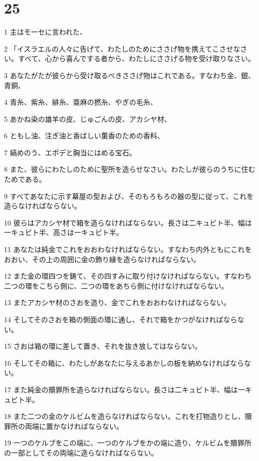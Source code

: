 \chapter{25}

\par 1 主はモーセに言われた、
\par 2 「イスラエルの人々に告げて、わたしのためにささげ物を携えてこさせなさい。すべて、心から喜んでする者から、わたしにささげる物を受け取りなさい。
\par 3 あなたがたが彼らから受け取るべきささげ物はこれである。すなわち金、銀、青銅、
\par 4 青糸、紫糸、緋糸、亜麻の撚糸、やぎの毛糸、
\par 5 あかね染の雄羊の皮、じゅごんの皮、アカシヤ材、
\par 6 ともし油、注ぎ油と香ばしい薫香のための香料、
\par 7 縞めのう、エポデと胸当にはめる宝石。
\par 8 また、彼らにわたしのために聖所を造らせなさい。わたしが彼らのうちに住むためである。
\par 9 すべてあなたに示す幕屋の型および、そのもろもろの器の型に従って、これを造らなければならない。
\par 10 彼らはアカシヤ材で箱を造らなければならない。長さは二キュビト半、幅は一キュビト半、高さは一キュビト半。
\par 11 あなたは純金でこれをおおわなければならない。すなわち内外ともにこれをおおい、その上の周囲に金の飾り縁を造らなければならない。
\par 12 また金の環四つを鋳て、その四すみに取り付けなければならない。すなわち二つの環をこちら側に、二つの環をあちら側に付けなければならない。
\par 13 またアカシヤ材のさおを造り、金でこれをおおわなければならない。
\par 14 そしてそのさおを箱の側面の環に通し、それで箱をかつがなければならない。
\par 15 さおは箱の環に差して置き、それを抜き放してはならない。
\par 16 そしてその箱に、わたしがあなたに与えるあかしの板を納めなければならない。
\par 17 また純金の贖罪所を造らなければならない。長さは二キュビト半、幅は一キュビト半。
\par 18 また二つの金のケルビムを造らなければならない。これを打物造りとし、贖罪所の両端に置かなければならない。
\par 19 一つのケルブをこの端に、一つのケルブをかの端に造り、ケルビムを贖罪所の一部としてその両端に造らなければならない。
